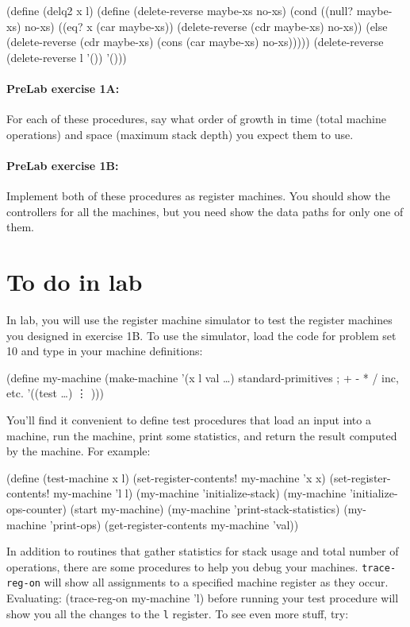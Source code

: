 \medskip
\beginlisp
(define (delq2 x l)
  (define (delete-reverse maybe-xs no-xs)
    (cond ((null? maybe-xs) no-xs)
          ((eq? x (car maybe-xs)) (delete-reverse (cdr maybe-xs) no-xs))
          (else (delete-reverse (cdr maybe-xs) (cons (car maybe-xs) no-xs)))))
  (delete-reverse (delete-reverse l '()) '()))
\endlisp
                 
\paragraph{PreLab exercise 1A:}
For each of these procedures, say what order of growth in time (total
machine operations) and space (maximum stack depth) you expect them to use.

\paragraph{PreLab exercise 1B:}
Implement both of these procedures as register machines.  You should show
the controllers for all the machines, but you need show the data paths for
only one of them.

\section{To do in lab}

In lab, you will use the register machine simulator to test the register
machines you designed in exercise 1B.  To use the simulator, load the code
for problem set 10 and type in your machine definitions:

\beginlisp
(define my-machine
  (make-machine
   '(x l val \ldots)
   standard-primitives          ; + - * / inc, etc.
   '((test \ldots)
     \vdots
     )))
\endlisp

You'll find it convenient to define test procedures that load an input
into a machine, run the machine, print some statistics, and return the
result computed by the machine.  For example:

\beginlisp
(define (test-machine x l)
  (set-register-contents! my-machine 'x x)
  (set-register-contents! my-machine 'l l)
  (my-machine 'initialize-stack)
  (my-machine 'initialize-ops-counter)
  (start my-machine)
  (my-machine 'print-stack-statistics)
  (my-machine 'print-ops)
  (get-register-contents my-machine 'val))
\endlisp

In addition to routines that gather statistics for stack usage and
total number of operations, there are some procedures to help you
debug your machines.  {\tt trace-reg-on} will show all
assignments to a specified machine register as they occur. Evaluating:
\beginlisp
(trace-reg-on my-machine 'l)
\endlisp
before running your test procedure will show you all the changes to the
{\tt l} register. To see even more stuff, try:

